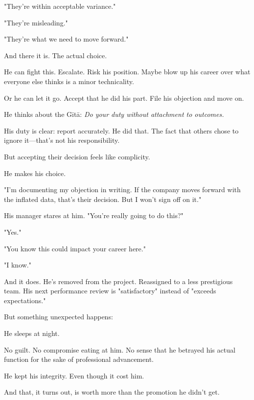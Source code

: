 \documentclass[11pt,twoside]{book}
\begin{document}
"They're within acceptable variance."

"They're misleading."

"They're what we need to move forward."

And there it is. The actual choice.

He can fight this. Escalate. Risk his position. Maybe blow up his career over what everyone else thinks is a minor technicality.

Or he can let it go. Accept that he did his part. File his objection and move on.

He thinks about the Gītā: \emph{Do your duty without attachment to outcomes.}

His duty is clear: report accurately. He did that. The fact that others chose to ignore it—that's not his responsibility.

But accepting their decision feels like complicity.

He makes his choice.

"I'm documenting my objection in writing. If the company moves forward with the inflated data, that's their decision. But I won't sign off on it."

His manager stares at him. "You're really going to do this?"

"Yes."

"You know this could impact your career here."

"I know."

And it does. He's removed from the project. Reassigned to a less prestigious team. His next performance review is "satisfactory" instead of "exceeds expectations."

But something unexpected happens:

He sleeps at night.

No guilt. No compromise eating at him. No sense that he betrayed his actual function for the sake of professional advancement.

He kept his integrity. Even though it cost him.

And that, it turns out, is worth more than the promotion he didn't get.
\end{document}
